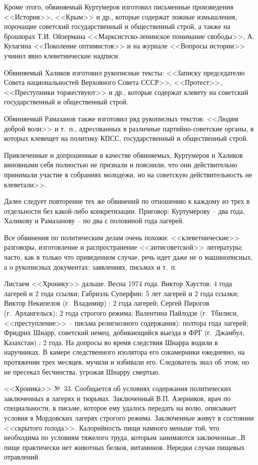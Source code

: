 \documentclass{book}
\begin{document}
Кроме этого, обвиняемый Куртумеров изготовил письменные произведения <<История>>, <<Крым>> и др., которые содер­жат ложные измышления, порочащие советский государственный и общественный строй, а также на брошюрах Т.И. Ойзермана <<Марксистско-ленинское понимание свободы>>, А. Кулагина <<Поколение оптимистов>> и на журнале <<Вопросы истории>> учинил явно клеветнические надписи.

Обвиняемый Халиков изготовил рукописные тексты: <<Записку председателю Совета национальностей Верховного Совета СССР>>, <<Протест>>, <<Преступники торжествуют>> и др., которые содержат клевету на советский государственный и общественный строй.

Обвиняемый Рамазанов также изготовил ряд рукописных текстов: <<Людям доброй воли>> и т.~п., адресованных в различные партийно-советские органы, в которых клевещет на поли­тику КПСС, государственный и общественный строй.

Привлеченные и допрошенные в качестве обвиняемых, Куртумеров и Халиков виновными себя полностью не признали и пояснили, что они действительно принимали участие в собраниях молодежи, но на советскую действительность не клеветали>>.

Далее следует повторение тех же обвинений по отношению к каждому из трех в отдельности без какой-либо конкретизации. Приговор: Куртумерову -- два года, Халикову и Рамазанову -- по два с половиной года лагерей.

Все обвинения по политическим делам очень похожи: <<клеветнические>> разговоры, изготовление и распространение <<антисоветской>> литературы; часто, как в только что приведенном случае, речь идет даже не о машинописных, а о рукописных документах: заявлениях, письмах и т.~п.

Листаем <<Хронику>> дальше. Весна 1974 года. Виктор Хаустов: 4 года лагерей и 2 года ссылки; Габриэль Суперфин:
5 лет лагерей и 2 года ссылки; Виктор Некипелов (г.~Владимир) : 2 года лагерей; Сергей Пирогов (г.~Архангельск): 2 го­да строгого режима; Валентина Пайлодзе (г.~Тбилиси, <<преступление>> -- письма религиозного содержания): полтора года лагерей; Фридрих Шнарр, советский немец, добивающийся выезда в ФРГ (г.~Джамбул, Казахстан) : 2 года. На допросы во время следствия Шнарра водили в наручниках. В камере след­ственного изолятора его сокамерники ежедневно, на протяжении трех месяцев, мучили и избивали его. Следователь знал об этом, но не пресекал бесчинства, угрожая Шнарру смертью.

<<Хроника>> №~33. Сообщается об условиях содержания политических заключенных в лагерях и тюрьмах. Заключенный В.П. Азерников, врач по специальности, в письме, которое ему удалось передать на волю, описывает условия в Мордовских лагерях строгого режима.
Заключенные живут в состоянии <<скрытого голода>>. Калорийность пищи намного меньше той, что необходима по усло­виям тяжелого труда, которым занимаются заключенные\ldots В пище практически нет животных белков, витаминов. Нередки случаи пищевых отравлений.
\end{document}
